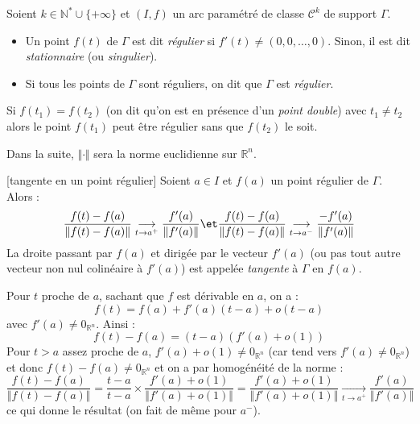 \documentclass[a4paper,10pt]{report}
\begin{document}
\begin{Definition}{} Soient $k \in \mathbb{N}^* \cup \lbrace + \infty \rbrace$ et $(I,f)$ un arc paramétré de classe $\mathcal{C}^k$ de support $\Gamma$.

\begin{itemize}
\item Un point $f(t)$ de $\Gamma$ est dit \emph{régulier} si $f'(t) \neq (0,0, \ldots, 0)$. Sinon, il est dit \emph{stationnaire} (ou \emph{singulier}).
\item Si tous les points de $\Gamma$ sont réguliers, on dit que $\Gamma$ est \emph{régulier}.
\end{itemize}
\end{Definition}

\begin{att} Si $f(t_1) = f(t_2)$ (on dit qu'on est en présence d'un \emph{point double}) avec $t_1 \neq t_2$ alors le point $f(t_1)$ peut être régulier sans que $f(t_2)$ le soit.
\end{att}

\medskip

Dans la suite, $\Vert \cdot \Vert$ sera la norme euclidienne sur $\mathbb{R}^n$.

\medskip

\begin{TheoremeDefinition}{}[tangente en un point régulier]
Soient $a \in I$ et $f(a)$ un point régulier de $\Gamma$. Alors :
$$ \dfrac{f(t)-f(a)}{\Vert f(t)-f(a) \Vert} \underset{t \rightarrow a^+}{\longrightarrow} \frac{f'(a)}{\Vert f'(a) \Vert} \et  \dfrac{f(t)-f(a)}{\Vert f(t)-f(a) \Vert} \underset{t \rightarrow a^-}{\longrightarrow} \frac{-f'(a)}{\Vert f'(a) \Vert}$$
La droite passant par $f(a)$ et dirigée par le vecteur $f'(a)$ (ou pas tout autre vecteur non nul colinéaire à $f'(a)$) est appelée \emph{tangente} à $\Gamma$ en $f(a)$.
\end{TheoremeDefinition}

\begin{Demonstration}{} Pour $t$ proche de $a$, sachant que $f$ est dérivable en $a$, on a :
$$ f(t)=f(a)+f'(a)(t-a)+o(t-a)$$
avec $f'(a) \neq 0_{\mathbb{R}^n}$. Ainsi :
$$ f(t)-f(a)= (t-a) (f'(a)+o(1))$$
Pour $t>a$ assez proche de $a$, $f'(a)+o(1) \neq  0_{\mathbb{R}^n}$ (car tend vers $f'(a) \neq  0_{\mathbb{R}^n}$) et donc $f(t)-f(a) \neq  0_{\mathbb{R}^n}$ et on a par homogénéité de la norme :
$$  \dfrac{f(t)-f(a)}{\Vert f(t)-f(a) \Vert} = \frac{t-a}{t-a} \times \frac{f'(a)+o(1)}{\Vert f'(a)+o(1)\Vert} = \frac{f'(a)+o(1)}{\Vert f'(a)+o(1)\Vert} \underset{t \rightarrow  a^+}{\longrightarrow} \frac{f'(a)}{\Vert f'(a) \Vert}$$
ce qui donne le résultat (on fait de même pour $a^{-}$).
\end{Demonstration}
\end{document}
